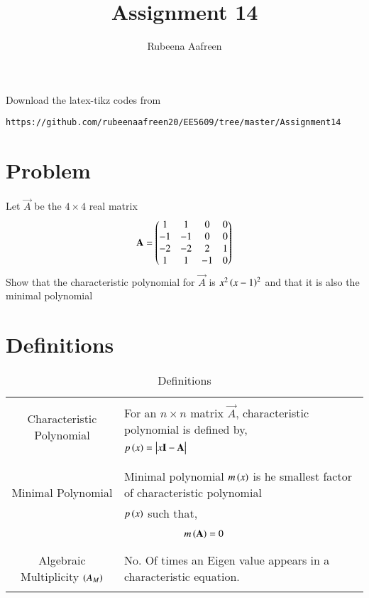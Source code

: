 \documentclass[journal,12pt]{IEEEtran}
\begin{document}
     \def\rightbox#1{\makebox[0in][r]{#1}}
     \def\centbox#1{\makebox[0in]{#1}}
     \def\topbox#1{\raisebox{-\baselineskip}[0in][0in]{#1}}
     \def\midbox#1{\raisebox{-0.5\baselineskip}[0in][0in]{#1}}
\vspace{3cm}
\title{Assignment 14}
\author{Rubeena Aafreen}
\maketitle
\bigskip
\renewcommand{\thefigure}{\theenumi}
\renewcommand{\thetable}{\theenumi}
%
Download the latex-tikz codes from 
%
\begin{lstlisting}
https://github.com/rubeenaafreen20/EE5609/tree/master/Assignment14
\end{lstlisting}
\section{\textbf{Problem}}
%
Let $\Vec{A}$ be the $4\times 4$ real matrix
\begin{align}
    \Vec{A}=\myvec{1&1&0&0\\-1&-1&0&0\\-2&-2&2&1\\1&1&-1&0}
\end{align}
Show that the characteristic polynomial for $\Vec{A}$ is $x^2\left(x-1\right)^2$ and that it is also the minimal polynomial
\section{\textbf{Definitions}}
\renewcommand{\thetable}{1}
\begin{table}[ht!]
\centering
\begin{tabular}{|c|l|}
    \hline
	\multirow{3}{*}{Characteristic Polynomial} 
	& \\
	& For an $n\times n$ matrix $\vec{A}$, characteristic polynomial is defined by,\\
	& $p\brak{x}=\mydet{x\Vec{I}-\Vec{A}}$\\
	&\\
	\hline
	\multirow{3}{*}{Minimal Polynomial} 
	&\\
	& Minimal polynomial $m\left(x\right)$ is he smallest factor of characteristic polynomial\\
	& $p\left(x\right)$ such that,\\
	&\\
	& $\qquad \qquad \qquad m\left(\mathbf{A}\right)=0$\\
	&\\
    \hline
    \multirow{3}{*}{Algebraic Multiplicity $\left(A_M\right)$}
    &\\
    & No. Of times an Eigen value appears in a characteristic equation.\\
    &\\
    \hline
\end{tabular}
\label{table:1}
    \caption{Definitions}
\end{table}
\end{document}
